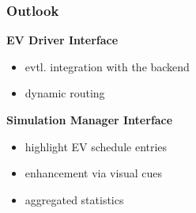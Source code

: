 \begin{frame}
	\frametitle{Outlook}

		\textbf{EV Driver Interface}
		\vspace{-4mm}
        \begin{itemize}
            \item evtl. integration with the backend
            \item dynamic routing
        \end{itemize}
	
	\vspace{6mm}
	
	\textbf{Simulation Manager Interface}
	\vspace{-4mm}
	\begin{itemize}
		\item highlight EV schedule entries
		\item enhancement via visual cues
		\item aggregated statistics
	\end{itemize}
	
\end{frame}
\clearpage